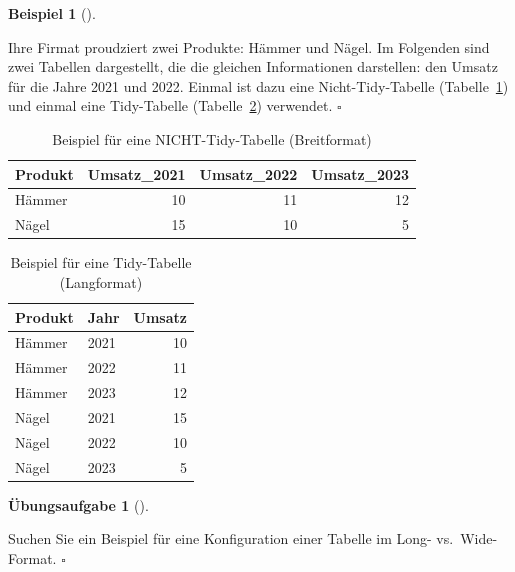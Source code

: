 \documentclass[
  a4paper,
]{scrbook}
\theoremstyle{definition}
\newtheorem{example}{Beispiel}[chapter]
\theoremstyle{definition}
\theoremstyle{definition}
\newtheorem{exercise}{Übungsaufgabe}[chapter]
\theoremstyle{remark}
\begin{document}
\begin{example}[]\protect\hypertarget{exm-widelong}{}\label{exm-widelong}

Ihre Firmat proudziert zwei Produkte: Hämmer und Nägel. Im Folgenden
sind zwei Tabellen dargestellt, die die gleichen Informationen
darstellen: den Umsatz für die Jahre 2021 und 2022. Einmal ist dazu eine
Nicht-Tidy-Tabelle (Tabelle~\ref{tbl-untidy1}) und einmal eine
Tidy-Tabelle (Tabelle~\ref{tbl-tidy1}) verwendet. \(\square\)

\end{example}

\begin{longtable}[]{@{}lrrr@{}}

\caption{\label{tbl-untidy1}Beispiel für eine NICHT-Tidy-Tabelle
(Breitformat)}

\tabularnewline

\toprule\noalign{}
Produkt & Umsatz\_2021 & Umsatz\_2022 & Umsatz\_2023 \\
\midrule\noalign{}
\endhead
\bottomrule\noalign{}
\endlastfoot
Hämmer & 10 & 11 & 12 \\
Nägel & 15 & 10 & 5 \\

\end{longtable}

\begin{longtable}[]{@{}llr@{}}

\caption{\label{tbl-tidy1}Beispiel für eine Tidy-Tabelle (Langformat)}

\tabularnewline

\toprule\noalign{}
Produkt & Jahr & Umsatz \\
\midrule\noalign{}
\endhead
\bottomrule\noalign{}
\endlastfoot
Hämmer & 2021 & 10 \\
Hämmer & 2022 & 11 \\
Hämmer & 2023 & 12 \\
Nägel & 2021 & 15 \\
Nägel & 2022 & 10 \\
Nägel & 2023 & 5 \\

\end{longtable}

\begin{exercise}[]\protect\hypertarget{exr-widelong}{}\label{exr-widelong}

Suchen Sie ein Beispiel für eine Konfiguration einer Tabelle im Long-
vs.~Wide-Format. \(\square\)

\end{exercise}
\end{document}

